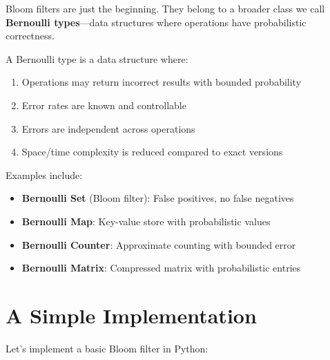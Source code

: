 Bloom filters are just the beginning. They belong to a broader class we call \textbf{Bernoulli types}—data structures where operations have probabilistic correctness.

\begin{definition}
A Bernoulli type is a data structure where:
\begin{enumerate}
\item Operations may return incorrect results with bounded probability
\item Error rates are known and controllable
\item Errors are independent across operations
\item Space/time complexity is reduced compared to exact versions
\end{enumerate}
\end{definition}

Examples include:
\begin{itemize}
\item \textbf{Bernoulli Set} (Bloom filter): False positives, no false negatives
\item \textbf{Bernoulli Map}: Key-value store with probabilistic values
\item \textbf{Bernoulli Counter}: Approximate counting with bounded error
\item \textbf{Bernoulli Matrix}: Compressed matrix with probabilistic entries
\end{itemize}

\section{A Simple Implementation}

Let's implement a basic Bloom filter in Python:

